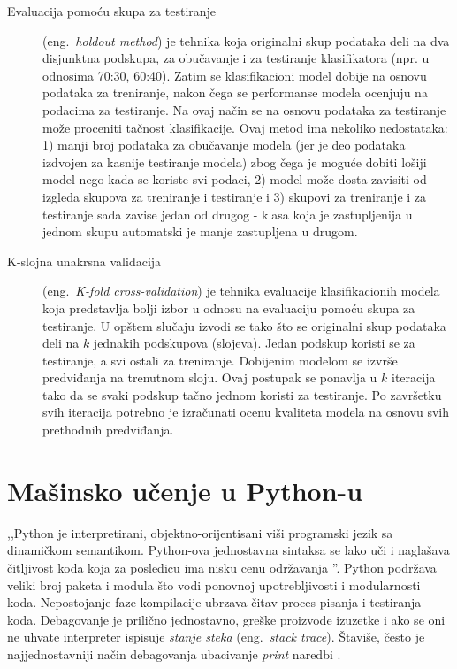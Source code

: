 \documentclass[12pt,oneside]{memoir}
\begin{document}
\begin{description}

\item[Evaluacija pomoću skupa za testiranje] (eng.~\textit{holdout method}) je tehnika koja originalni skup podataka deli na dva disjunktna podskupa, za obučavanje i za testiranje klasifikatora (npr. u odnosima 70:30, 60:40). Zatim se klasifikacioni model dobije na osnovu podataka za treniranje, nakon čega se performanse modela ocenjuju na podacima za testiranje. Na ovaj način se na osnovu podataka za testiranje može proceniti tačnost klasifikacije. Ovaj metod ima nekoliko nedostataka: 1) manji broj podataka za obučavanje modela (jer je deo podataka izdvojen za kasnije testiranje modela) zbog čega je moguće dobiti lošiji model nego kada se koriste svi podaci, 2) model može dosta zavisiti od izgleda skupova za treniranje i testiranje i 3) skupovi za treniranje i za testiranje sada zavise jedan od drugog - klasa koja je zastupljenija u jednom skupu automatski je manje zastupljena u drugom.

\item[K-slojna unakrsna validacija] (eng.~\textit{K-fold cross-validation}) je tehnika evaluacije klasifikacionih modela koja predstavlja bolji izbor u odnosu na evaluaciju pomoću skupa za testiranje. U opštem slučaju izvodi se tako što se originalni skup podataka deli na $k$ jednakih podskupova (slojeva). Jedan podskup koristi se za testiranje, a svi ostali za treniranje. Dobijenim modelom se izvrše predviđanja na trenutnom sloju. Ovaj postupak se ponavlja u $k$ iteracija tako da se svaki podskup tačno jednom koristi za testiranje. Po završetku svih iteracija potrebno je izračunati ocenu kvaliteta modela na osnovu svih prethodnih predviđanja. 
\end{description}


\section{Mašinsko učenje u Python-u}
\label{sec:python}

,,Python je interpretirani, objektno-orijentisani viši programski jezik sa dinamičkom semantikom. Python-ova jednostavna sintaksa se lako uči i naglašava čitljivost koda koja za posledicu ima nisku cenu održavanja \cite{python-blurb}''. Python podržava veliki broj paketa i modula što vodi ponovnoj upotrebljivosti i modularnosti koda. Nepostojanje faze kompilacije ubrzava čitav proces pisanja i testiranja koda. Debagovanje je prilično jednostavno, greške proizvode izuzetke i ako se oni ne uhvate interpreter ispisuje \textit{stanje steka} (eng.~\textit{stack trace}). Štaviše, često je najjednostavniji način debagovanja ubacivanje \textit{print} naredbi \cite{python-blurb}. %
\end{document}
